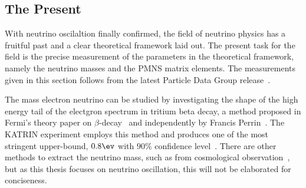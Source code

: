 





\subsection{The Present}
With neutrino oscilaltion finally confirmed, the field of neutrino physics has a fruitful past and a clear theoretical framework laid out.
The present task for the field is the precise measurement of the parameters in the theoretical framework, namely the neutrino masses and the PMNS matrix elements.
The measurements given in this section follows from the latest Particle Data Group release~\cite{ParticleDataGroup:2024cfk}.

The mass electron neutrino can be studied by investigating the shape of the high energy tail of the electgron spectrum in tritium beta decay, a method proposed in Fermi's theory paper on $\beta$-decay~\cite{Fermi:1934hr} and independently by Francis Perrin~\cite{Perrin1933}.
The KATRIN experiment employs this method and produces one of the most stringent upper-bound, $0.8\ev$ with $90\%$ confidence level~\cite{KATRIN:2021uub}.
There are other methods to extract the neutrino mass, such as from cosmological observation~\cite{Brieden:2022lsd}, but as this thesis focuses on neutrino oscillation, this will not be elaborated for conciseness.

